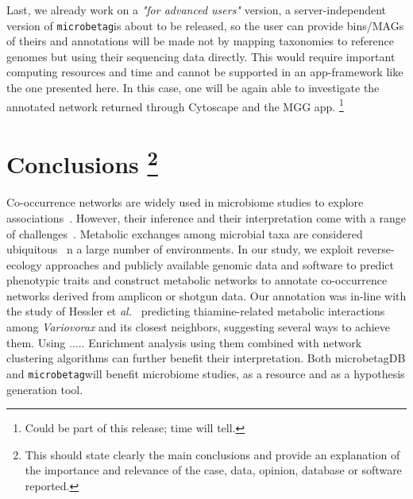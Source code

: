 \documentclass[sn-mathphys,Numbered]{sn-jnl}  %
\theoremstyle{thmstyleone}%
\theoremstyle{thmstyletwo}%
\theoremstyle{thmstylethree}%
\newcommand{\microbetag}{\texttt{microbetag}}
\begin{document}
        Last, we already work on a \textit{"for advanced users"} version, a server-independent version of \microbetag is about to be released, so the user can provide bins/MAGs of theirs and annotations will be made not by mapping taxonomies to reference genomes but using their sequencing data directly.
        This would require important computing resources and time and cannot be supported in an app-framework like the one presented here. 
        In this case, one will be again able to investigate the annotated network returned through Cytoscape and the MGG app.
        \footnote{Could be part of this release; time will tell.}




\section*{Conclusions
\footnote{
    This should state clearly the main conclusions and provide an explanation of the importance and relevance of the case, data, opinion, database or software reported.
}
}
\label{sec:conclusions}


    Co-occurrence networks are widely used in microbiome studies to explore associations~\cite{rottjers2018hairballs}. 
    However, their inference and their interpretation come with a range of challenges~\cite{faust2021open}.
    Metabolic exchanges among microbial taxa are considered ubiquitous~\cite{kost2023metabolic} n a large number of environments. 
    In our study, we exploit reverse-ecology approaches and publicly available genomic data and software to predict phenotypic traits and construct metabolic networks to annotate co-occurrence networks derived from amplicon or shotgun data.
    Our annotation was in-line with the study of Hessler et \textit{al.}~\cite{hessler2023vitamin} predicting thiamine-related metabolic interactions among \textit{Variovorax} and its closest neighbors, suggesting several ways to achieve them. 
    Using ..... 
    Enrichment analysis using them combined with network clustering algorithms can further benefit their interpretation.
    Both microbetagDB and \microbetag will benefit microbiome studies, as a resource and as a hypothesis generation tool.
\end{document}
